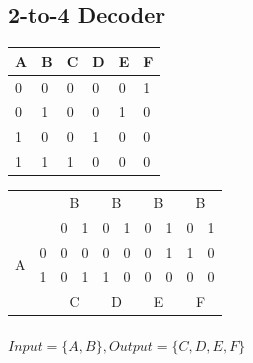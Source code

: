 \documentclass{report}
\begin{document}
            \subsection{2-to-4 Decoder}
                \begin{table}[!htb]
                    \centering
                    \begin{tabular}{|l|l|l|l|l|l|}
                    \hline
                    A & B & C & D & E & F \\ \hline
                    0 & 0 & 0 & 0 & 0 & 1 \\ \hline
                    0 & 1 & 0 & 0 & 1 & 0 \\ \hline
                    1 & 0 & 0 & 1 & 0 & 0 \\ \hline
                    1 & 1 & 1 & 0 & 0 & 0 \\ \hline
                    \end{tabular}
                \end{table}
                \begin{table}[!htb]
                    \centering
                    \begin{tabular}{|c|c|c|c|c|c|c|c|c|c|}
                        \hline
                        \multicolumn{2}{|c|}{\multirow{2}{*}{}} & \multicolumn{2}{c|}{B} & \multicolumn{2}{c|}{B} & \multicolumn{2}{c|}{B} & \multicolumn{2}{c|}{B} \\ \cline{3-10} 
                        \multicolumn{2}{|c|}{}                  & 0          & 1         & 0          & 1         & 0          & 1         & 0          & 1         \\ \hline
                        \multirow{2}{*}{A}          & 0         & 0          & 0         & 0          & 0         & 0          & 1         & 1          & 0         \\ \cline{2-10} 
                                                    & 1         & 0          & 1         & 1          & 0         & 0          & 0         & 0          & 0         \\ \hline
                        \multicolumn{2}{|l|}{}                  & \multicolumn{2}{c|}{C} & \multicolumn{2}{c|}{D} & \multicolumn{2}{c|}{E} & \multicolumn{2}{c|}{F} \\ \hline
                    \end{tabular}
                \end{table}
                \paragraph{$ Input=\{A, B\}, Output=\{C, D, E, F\} $}
\end{document}
